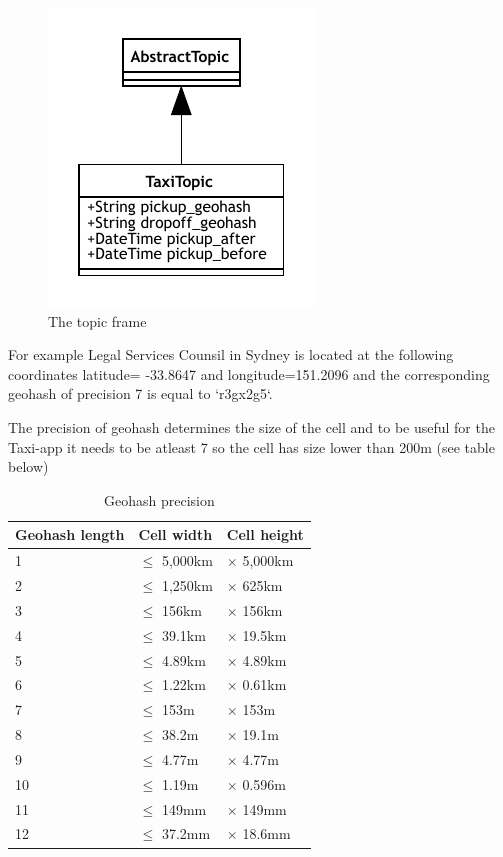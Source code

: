 \documentclass{article}
\begin{document}
\begin{figure}
	\centering
	\includegraphics[scale=1.0]{Topic.pdf}
	\caption{The topic frame}
	\label{fig:fr:topic}
\end{figure}


For example Legal Services Counsil in Sydney is located at the following coordinates latitude= -33.8647 and longitude=151.2096 and the corresponding geohash of precision 7 is equal to `r3gx2g5`.

The precision of geohash determines the size of the cell and to be useful for the Taxi-app it needs to be atleast 7 so the cell has size lower than 200m (see table below)

\begin{table}
	\centering
	\begin{tabular}{lll}
		\toprule
		Geohash length & Cell width & Cell height \\
		\midrule
		1 & $\le$ 5,000km & $\times$ 5,000km  \\
		2 & $\le$ 1,250km & $\times$ 625km \\
		3 & $\le$ 156km & $\times$ 156km \\
		4 & $\le$ 39.1km & $\times$ 19.5km \\
		5 & $\le$ 4.89km & $\times$ 4.89km \\
		6 & $\le$ 1.22km & $\times$ 0.61km \\
		7 & $\le$ 153m     & $\times$ 153m \\
		8 & $\le$ 38.2m & $\times$ 19.1m \\
		9 & $\le$ 4.77m & $\times$ 4.77m \\
		10 & $\le$ 1.19m & $\times$ 0.596m \\
		11 & $\le$ 149mm & $\times$ 149mm \\
		12 & $\le$ 37.2mm & $\times$ 18.6mm \\
		\bottomrule
	\end{tabular}
	\caption{Geohash precision}
	\label{tab:geoprec}
\end{table}
\end{document}
